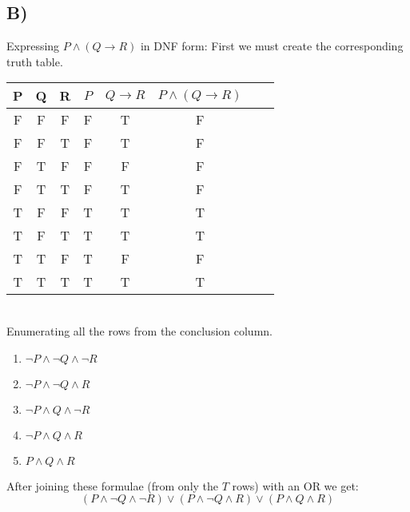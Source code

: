 \documentclass[a4paper]{article}
\begin{document}
\subsection*{B)}
Expressing $P \wedge (Q \rightarrow R)$ in DNF form:
First we must create the corresponding truth table.
\begin{table}[ht]
\centering
\def\arraystretch{1.5}
\begin{tabular}{|c|c|c|c|c|c|c|c|}
\hline
P & Q & R & $P$ & $Q \rightarrow R$ & $P \wedge (Q \rightarrow R)$  \\ \hline
F & F & F & F & T & F  \\
F & F & T & F & T & F  \\
F & T & F & F & F & F  \\
F & T & T & F & T & F  \\
T & F & F & T & T & T  \\
T & F & T & T & T & T  \\
T & T & F & T & F & F  \\
T & T & T & T & T & T  \\ \hline
\end{tabular}
\end{table}
\\Enumerating all the rows from the conclusion column.
\begin{enumerate}
\item $\neg P \wedge \neg Q \wedge \neg R$
\item $\neg P \wedge \neg Q \wedge R$
\item $\neg P \wedge Q \wedge \neg R$
\item $\neg P \wedge Q \wedge R$
\item $P \wedge Q \wedge R$
\end{enumerate}
After joining these formulae (from only the $T$ rows) with an OR we get:
$$(P \wedge \neg Q \wedge \neg R) \vee (P \wedge \neg Q \wedge R) \vee (P \wedge Q \wedge R)$$
\end{document}

